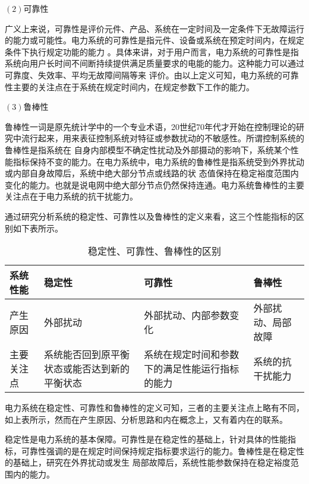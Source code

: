 $(2)$可靠性

广义上来说，可靠性是评价元件、产品、系统在一定时间及一定条件下无故障运行的能力或可能性。电力系统的可靠性是指元件、设备或系统在预定时间内，在规定条件下执行规定功能的能力
\cite{refs62}。具体来讲，对于用户而言，电力系统的可靠性是指系统向用户长时间不间断持续提供满足质量要求的电能的能力。这种能力可以通过可靠度、失效率、平均无故障间隔等来
评价。由以上定义可知，电力系统的可靠性主要的关注点在于系统在规定时间内，在规定参数下工作的能力。

$(3)$鲁棒性

鲁棒性一词是原先统计学中的一个专业术语，20世纪70年代才开始在控制理论的研究中流行起来，用来表征控制系统对特征或参数扰动的不敏感性\cite{refs63}。所谓控制系统的鲁棒性是指系统在
自身内部模型不确定性扰动及外部摄动的影响下，系统某个性能指标保持不变的能力。在电力系统中，电力系统的鲁棒性是指系统受到外界扰动或内部自身故障后，系统中绝大部分节点或线路的状
态值保持在稳定裕度范围内变化的能力。也就是说电网中绝大部分节点仍然保持连通。电力系统鲁棒性的主要关注点在于电力系统的抗干扰能力。

通过研究分析系统的稳定性、可靠性以及鲁棒性的定义来看，这三个性能指标的区别如下表所示。

\begin{table}[H]
\centering
\caption{稳定性、可靠性、鲁棒性的区别}
\label{tab:chap3:deference}
\begin{tabular}{C{3cm}C{3cm}C{3cm}C{3cm}}
\toprule
\textbf{系统性能} & \textbf{稳定性} & \textbf{可靠性} & \textbf{鲁棒性}\\
    \midrule
    产生原因       &外部扰动           &外部扰动、内部参数变化         &外部扰动、局部故障\\
    主要关注点     &系统能否回到原平衡状态或能否达到新的平衡状态 
                                          &系统在规定时间和参数下的满足性能运行指标的能力 
                                                                        &系统的抗干扰能力\\
\bottomrule
\end{tabular}
\end{table}

电力系统在稳定性、可靠性和鲁棒性的定义可知，三者的主要关注点上略有不同，如上表所示，然而在产生原因、分析思路和内在概念上，又有着内在的联系。

稳定性是电力系统的基本保障。可靠性是在稳定性的基础上，针对具体的性能指标，可靠性强调的是在规定时间保持规定指标要求运行的能力。鲁棒性是在稳定性的基础上，研究在外界扰动或发生
局部故障后，系统性能参数保持在稳定裕度范围内的能力。

